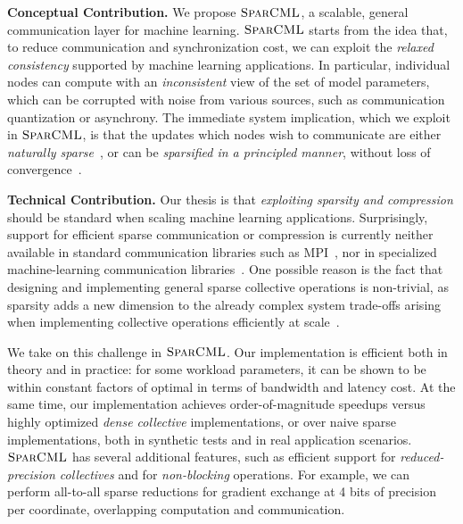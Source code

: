 \documentclass[11pt]{article}
\renewcommand{\paragraph}[1]{\vspace{0.1em} \noindent \textbf{#1}}
\newcommand{\mml}{$\textsc{SparCML}$}
\begin{document}
\paragraph{Conceptual Contribution.} We propose \mml{}, a scalable, general communication layer for machine learning. 
\mml{} starts from the idea that, to reduce communication and synchronization cost, we can exploit the \emph{relaxed consistency} supported by machine learning applications. 
In particular, individual nodes can compute with an \emph{inconsistent} view of the set of model parameters, which can be corrupted with noise from various sources, such as communication quantization or asynchrony. 
The immediate system implication, which we exploit in \mml{}, is that the updates which nodes wish to communicate are either \emph{naturally sparse}~\cite{webb2006introducing}, or can be \emph{sparsified in a principled manner}, without loss of convergence~\cite{alistarh2016qsgd, aji2017sparse, dryden2016communication, sun2017meprop}. 

%     
\paragraph{Technical Contribution.} Our thesis is that \emph{exploiting sparsity and compression} should be standard when scaling machine learning applications.  
Surprisingly, support for efficient sparse communication or compression
is currently neither available in standard communication libraries such as 
MPI~\cite{mpi-3.0}, nor in specialized machine-learning communication libraries~\cite{NCCL}. 
One possible reason is the fact that designing and implementing general sparse collective operations is non-trivial, as sparsity adds a new dimension to the already complex system trade-offs arising when implementing collective operations efficiently at scale~\cite{thakur2003improving}. 

We take on this challenge in \mml{}. 
Our implementation is efficient both in theory and in practice: for some workload parameters, it can be shown to be within constant factors of optimal in terms of bandwidth and latency cost. At the same time, our implementation achieves order-of-magnitude speedups versus highly optimized \emph{dense collective} implementations, or over naive sparse implementations, both in synthetic tests and in real application scenarios.  \mml{} has several additional features, such as efficient support for \emph{reduced-precision collectives} and for \emph{non-blocking} operations. 
For example, we can perform all-to-all sparse reductions for gradient exchange at 4 bits of precision per coordinate, overlapping computation and communication. 
\end{document}
